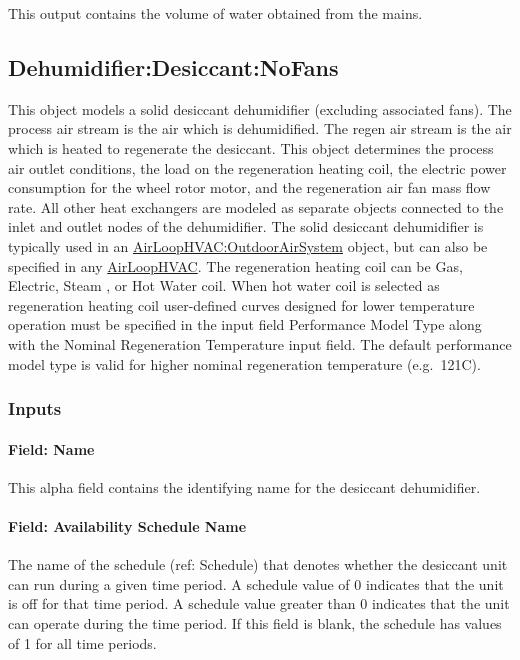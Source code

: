 This output contains the volume of water obtained from the mains.

\subsection{Dehumidifier:Desiccant:NoFans}\label{dehumidifierdesiccantnofans}

This object models a solid desiccant dehumidifier (excluding associated fans). The process air stream is the air which is dehumidified. The regen air stream is the air which is heated to regenerate the desiccant. This object determines the process air outlet conditions, the load on the regeneration heating coil, the electric power consumption for the wheel rotor motor, and the regeneration air fan mass flow rate. All other heat exchangers are modeled as separate objects connected to the inlet and outlet nodes of the dehumidifier. The solid desiccant dehumidifier is typically used in an \hyperref[airloophvacoutdoorairsystem]{AirLoopHVAC:OutdoorAirSystem} object, but can also be specified in any \hyperref[airloophvac]{AirLoopHVAC}. The regeneration heating coil can be Gas, Electric, Steam , or Hot Water coil. When hot water coil is selected as regeneration heating coil user-defined curves designed for lower temperature operation must be specified in the input field Performance Model Type along with the Nominal Regeneration Temperature input field. The default performance model type is valid for higher nominal regeneration temperature (e.g.~121C).

\subsubsection{Inputs}\label{inputs-011}

\paragraph{Field: Name}\label{field-name-010}

This alpha field contains the identifying name for the desiccant dehumidifier.

\paragraph{Field: Availability Schedule Name}\label{field-availability-schedule-name-004}

The name of the schedule (ref: Schedule) that denotes whether the desiccant unit can run during a given time period. A schedule value of 0 indicates that the unit is off for that time period. A schedule value greater than 0 indicates that the unit can operate during the time period. If this field is blank, the schedule has values of 1 for all time periods.

